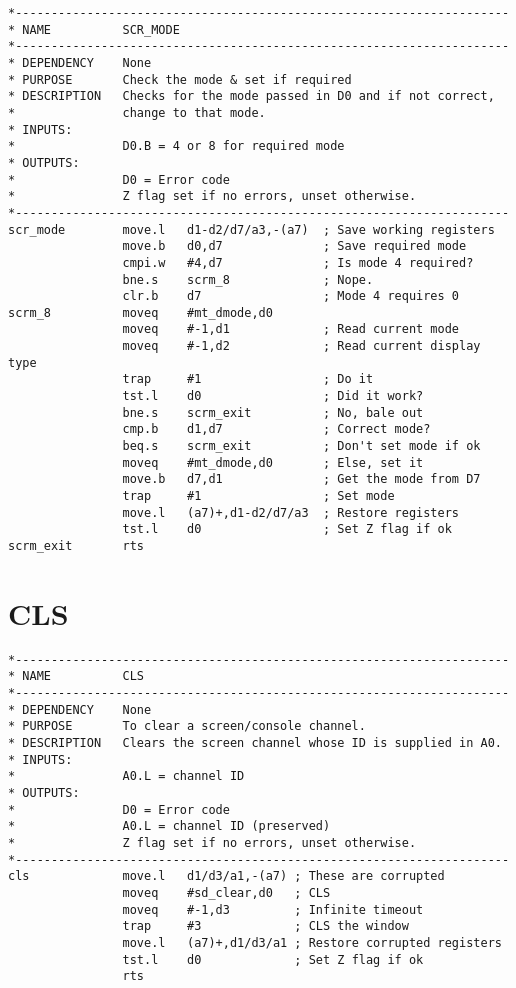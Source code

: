 \begin{lstlisting}[firstnumber=1,caption={SCR\_MODE}]
*---------------------------------------------------------------------
* NAME          SCR_MODE
*---------------------------------------------------------------------
* DEPENDENCY    None
* PURPOSE       Check the mode & set if required
* DESCRIPTION   Checks for the mode passed in D0 and if not correct, 
*               change to that mode.
* INPUTS:
*               D0.B = 4 or 8 for required mode
* OUTPUTS:
*               D0 = Error code
*               Z flag set if no errors, unset otherwise.
*---------------------------------------------------------------------
scr_mode        move.l   d1-d2/d7/a3,-(a7)  ; Save working registers
                move.b   d0,d7              ; Save required mode
                cmpi.w   #4,d7              ; Is mode 4 required?
                bne.s    scrm_8             ; Nope.
                clr.b    d7                 ; Mode 4 requires 0
scrm_8          moveq    #mt_dmode,d0
                moveq    #-1,d1             ; Read current mode
                moveq    #-1,d2             ; Read current display type
                trap     #1                 ; Do it
                tst.l    d0                 ; Did it work?
                bne.s    scrm_exit          ; No, bale out
                cmp.b    d1,d7              ; Correct mode?
                beq.s    scrm_exit          ; Don't set mode if ok
                moveq    #mt_dmode,d0       ; Else, set it
                move.b   d7,d1              ; Get the mode from D7
                trap     #1                 ; Set mode
                move.l   (a7)+,d1-d2/d7/a3  ; Restore registers
                tst.l    d0                 ; Set Z flag if ok
scrm_exit       rts
\end{lstlisting}

\section{CLS}
\label{ch9-CLS}%

\begin{lstlisting}[firstnumber=1,caption={CLS}]
*---------------------------------------------------------------------
* NAME          CLS
*---------------------------------------------------------------------
* DEPENDENCY    None
* PURPOSE       To clear a screen/console channel.
* DESCRIPTION   Clears the screen channel whose ID is supplied in A0.
* INPUTS:
*               A0.L = channel ID
* OUTPUTS:
*               D0 = Error code
*               A0.L = channel ID (preserved)
*               Z flag set if no errors, unset otherwise.
*---------------------------------------------------------------------
cls             move.l   d1/d3/a1,-(a7) ; These are corrupted
                moveq    #sd_clear,d0   ; CLS
                moveq    #-1,d3         ; Infinite timeout
                trap     #3             ; CLS the window
                move.l   (a7)+,d1/d3/a1 ; Restore corrupted registers
                tst.l    d0             ; Set Z flag if ok
                rts
\end{lstlisting}

